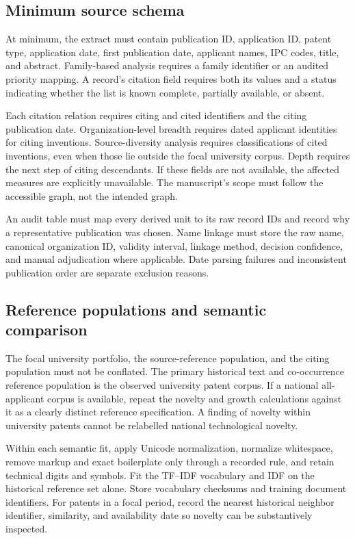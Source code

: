 \subsection{Minimum source schema}
At minimum, the extract must contain publication ID, application ID, patent type,
application date, first publication date, applicant names, IPC codes, title, and
abstract. Family-based analysis requires a family identifier or an audited priority
mapping. A record's citation field requires both its values and a status indicating
whether the list is known complete, partially available, or absent.

Each citation relation requires citing and cited identifiers and the citing
publication date. Organization-level breadth requires dated applicant identities
for citing inventions. Source-diversity analysis requires classifications of
cited inventions, even when those lie outside the focal university corpus.
Depth requires the next step of citing descendants. If these fields are not
available, the affected measures are explicitly unavailable. The manuscript's
scope must follow the accessible graph, not the intended graph.

An audit table must map every derived unit to its raw record IDs and record why
a representative publication was chosen. Name linkage must store the raw name,
canonical organization ID, validity interval, linkage method, decision confidence,
and manual adjudication where applicable. Date parsing failures and inconsistent
publication order are separate exclusion reasons.

\subsection{Reference populations and semantic comparison}
The focal university portfolio, the source-reference population, and the citing
population must not be conflated. The primary historical text and co-occurrence
reference population is the observed university patent corpus. If a national
all-applicant corpus is available, repeat the novelty and growth calculations
against it as a clearly distinct reference specification. A finding of novelty
within university patents cannot be relabelled national technological novelty.

Within each semantic fit, apply Unicode normalization, normalize whitespace,
remove markup and exact boilerplate only through a recorded rule, and retain
technical digits and symbols. Fit the TF--IDF vocabulary and IDF on the historical
reference set alone. Store vocabulary checksums and training document identifiers.
For patents in a focal period, record the nearest historical neighbor identifier,
similarity, and availability date so novelty can be substantively inspected.

